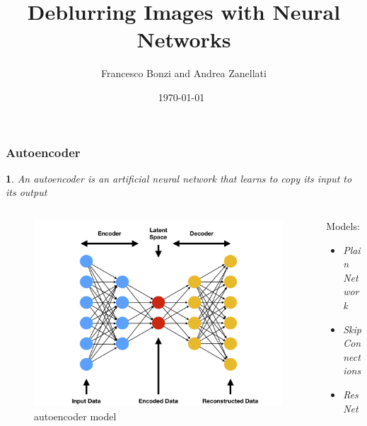 \documentclass [handout] {beamer}
\title{Deblurring Images with Neural Networks}
\author{Francesco Bonzi and Andrea Zanellati}
\institute{Deep Learning Course Project \\
	\medskip
	\textit{prof. Andrea Asperti}
}
\date{\today\  \\ }
\newtheorem{formula}{}{}
\begin{document}
\begin{frame}
	\titlepage
\end{frame}

\begin{frame}
	\frametitle{Autoencoder}
	\begin{formula}
		An autoencoder is an artificial neural network that learns to copy its input to its output
	\end{formula}
	\begin{columns}
		\begin{column}{0.4\textwidth}
			\begin{figure}[]
			\includegraphics[width=1.3\columnwidth]{autoencoder_model.png}
    			\caption{autoencoder model}
			\end{figure}
		\end{column}
		\begin{column}{0.4\textwidth}
			Models:
			\begin{itemize}
				\item \textit{Plain Network}
				\item \textit{Skip Connections}
				\item \textit{ResNet}
			\end{itemize}
		\end{column}
	\end{columns}
\end{frame}
\end{document}
